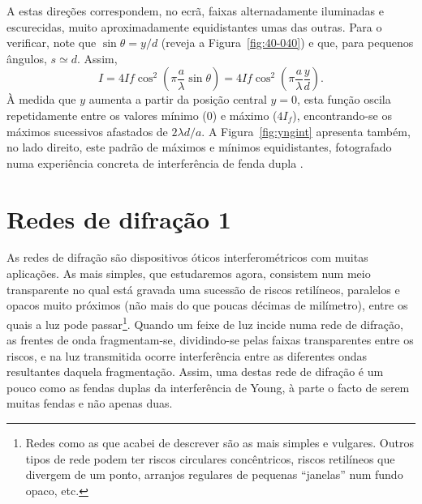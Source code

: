 A estas direções
correspondem, no ecrã, faixas alternadamente iluminadas e escurecidas,
muito aproximadamente equidistantes umas das outras. Para o verificar, note que
$\sin\theta=y/d$ (reveja a Figura~\ref{fig:40-040}) e que, para pequenos
ângulos, $s\simeq d$. Assim,
\begin{equation*}
  I=4If\cos^2\left(\pi\frac{a}{\lambda}\sin\theta\right)=
  4If\cos^2\left(\pi\frac{a}{\lambda}\frac{y}{d}\right).
\end{equation*}
À medida que $y$ aumenta a partir da posição central $y=0$, esta função oscila
repetidamente entre os valores mínimo (0) e máximo ($4I_f$), encontrando-se os
máximos sucessivos afastados de $2\lambda d/a$.  A Figura~\ref{fig:yngint}
apresenta também, no lado direito, este padrão de máximos e mínimos
equidistantes, fotografado numa experiência concreta de interferência de fenda
dupla .

\section{Redes de difração 1} 
As redes de difração são dispositivos óticos interferométricos com muitas
aplicações. As mais simples, que estudaremos agora, consistem num meio
transparente no qual está gravada uma sucessão de riscos retilíneos, paralelos
e opacos muito próximos (não mais do que poucas décimas de milímetro), entre os
quais a luz pode passar\footnote{Redes como as que acabei de descrever são as
  mais simples e vulgares. Outros tipos de rede podem ter riscos circulares
  concêntricos, riscos retilíneos que divergem de um ponto, arranjos regulares
  de pequenas ``janelas'' num fundo opaco, etc.}. Quando um feixe de luz incide
numa rede de difração, as frentes de onda fragmentam-se, dividindo-se pelas
faixas transparentes entre os riscos, e na luz transmitida ocorre interferência
entre as diferentes ondas resultantes daquela fragmentação.  Assim, uma destas
rede de difração é um pouco como as fendas duplas da interferência de Young, à
parte o facto de serem muitas fendas e não apenas duas. 


